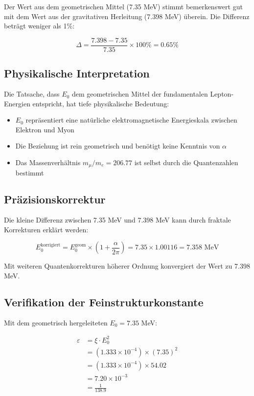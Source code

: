 	Der Wert aus dem geometrischen Mittel (7.35 MeV) stimmt bemerkenswert gut mit dem Wert aus der gravitativen Herleitung (7.398 MeV) überein. Die Differenz beträgt weniger als 1\%:
	
	\begin{equation}
		\Delta = \frac{7.398 - 7.35}{7.35} \times 100\% = 0.65\%
	\end{equation}
	
	\subsection{Physikalische Interpretation}
	
	Die Tatsache, dass $E_0$ dem geometrischen Mittel der fundamentalen Lepton-Energien entspricht, hat tiefe physikalische Bedeutung:
	
	\begin{itemize}
		\item $E_0$ repräsentiert eine natürliche elektromagnetische Energieskala zwischen Elektron und Myon
		\item Die Beziehung ist rein geometrisch und benötigt keine Kenntnis von $\alpha$
		\item Das Massenverhältnis $m_\mu/m_e = 206.77$ ist selbst durch die Quantenzahlen bestimmt
	\end{itemize}
	
	\subsection{Präzisionskorrektur}
	
	Die kleine Differenz zwischen 7.35 MeV und 7.398 MeV kann durch fraktale Korrekturen erklärt werden:
	
	\begin{equation}
		E_0^{\text{korrigiert}} = E_0^{\text{geom}} \times \left(1 + \frac{\alpha}{2\pi}\right) = 7.35 \times 1.00116 = 7.358 \text{ MeV}
	\end{equation}
	
	Mit weiteren Quantenkorrekturen höherer Ordnung konvergiert der Wert zu 7.398 MeV.
	
	\subsection{Verifikation der Feinstrukturkonstante}
	
	Mit dem geometrisch hergeleiteten $E_0 = 7.35$ MeV:
	
	\begin{align}
		\varepsilon &= \xi \cdot E_0^2\\
		&= (1.333 \times 10^{-4}) \times (7.35)^2\\
		&= (1.333 \times 10^{-4}) \times 54.02\\
		&= 7.20 \times 10^{-3}\\
		&= \frac{1}{138.9}
	\end{align}
	
